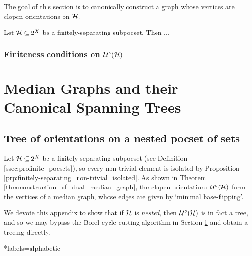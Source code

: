 \documentclass{amsart}
\begin{document}
    The goal of this section is to canonically construct a graph whose vertices are clopen orientations on $\mathcal{H}$.

    \begin{theorem}\label{thm:construction_of_dual_median_graph}
        Let $\mathcal{H}\subseteq2^X$ be a finitely-separating subpocset. Then ...
    \end{theorem}

    \subsubsection{Finiteness conditions on $\mathcal{U}^\circ(\mathcal{H})$}

    \section{Median Graphs and their Canonical Spanning Trees}\label{sec:spanning_trees_of_median_graphs_with_finite_hyperplanes}

    \begin{appendices}
        \section{Tree of orientations on a nested pocset of sets}

        Let $\mathcal{H}\subseteq2^X$ be a finitely-separating subpocset (see Definition \ref{ssec:profinite_pocsets}), so every non-trivial element is isolated by Proposition \ref{prp:finitely-separating_non-trivial_isolated}. As shown in Theorem \ref{thm:construction_of_dual_median_graph}, the clopen orientations $\mathcal{U}^\circ(\mathcal{H})$ form the vertices of a median graph, whose edges are given by `minimal base-flipping'.

        We devote this appendix to show that if $\mathcal{H}$ is \textit{nested}, then $\mathcal{U}^\circ(\mathcal{H})$ is in fact a tree, and so we may bypass the Borel cycle-cutting algorithm in Section \ref{sec:spanning_trees_of_median_graphs_with_finite_hyperplanes} and obtain a treeing directly.
    \end{appendices}

    \begin{bibdiv}
        \begin{biblist}*{labels={alphabetic}}
        \end{biblist}
    \end{bibdiv}
\end{document}
